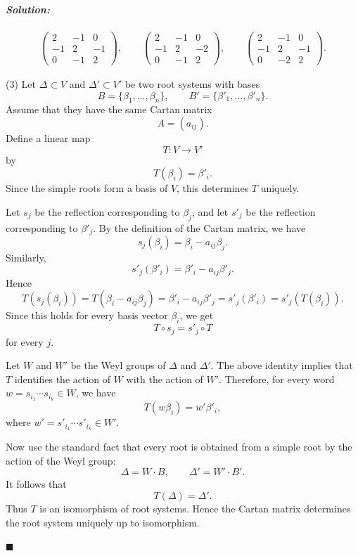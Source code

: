 \documentclass[12pt, a4paper]{article}
\newenvironment{solution}
  {\paragraph{\textit{Solution:}}\par\medskip}
  {\hfill$\blacksquare$\vspace{0.1cm}}
\begin{document}
\begin{solution}
\begin{align*}
  \begin{pmatrix}
2&-1&0\\
-1&2&-1\\
0&-1&2
\end{pmatrix}, \qquad 
\begin{pmatrix}
2&-1&0\\
-1&2&-2\\
0&-1&2
\end{pmatrix}, \qquad 
\begin{pmatrix}
2&-1&0\\
-1&2&-1\\
0&-2&2
\end{pmatrix}.
\end{align*}

(3) Let \(\Delta\subset V\) and \(\Delta'\subset V'\) be two root systems with bases
\[
B=\{\beta_1,\dots,\beta_n\},
\qquad
B'=\{\beta'_1,\dots,\beta'_n\}.
\]
Assume that they have the same Cartan matrix
\[
A=(a_{ij}).
\]
Define a linear map
\[
T:V\longrightarrow V'
\]
by
\[
T(\beta_i)=\beta'_i.
\]
Since the simple roots form a basis of \(V\), this determines \(T\) uniquely.

Let \(s_j\) be the reflection corresponding to \(\beta_j\), and let \(s'_j\) be the
reflection corresponding to \(\beta'_j\). By the definition of the Cartan matrix,
we have
\[
s_j(\beta_i)=\beta_i-a_{ij}\beta_j.
\]
Similarly,
\[
s'_j(\beta'_i)=\beta'_i-a_{ij}\beta'_j.
\]
Hence
\[
T(s_j(\beta_i))
=
T(\beta_i-a_{ij}\beta_j)
=
\beta'_i-a_{ij}\beta'_j
=
s'_j(\beta'_i)
=
s'_j(T(\beta_i)).
\]
Since this holds for every basis vector \(\beta_i\), we get
\[
T\circ s_j=s'_j\circ T
\]
for every \(j\).

Let \(W\) and \(W'\) be the Weyl groups of \(\Delta\) and \(\Delta'\). The above
identity implies that \(T\) identifies the action of \(W\) with the action of
\(W'\). Therefore, for every word \(w=s_{i_1}\cdots s_{i_k}\in W\), we have
\[
T(w\beta_i)=w'\beta'_i,
\]
where \(w'=s'_{i_1}\cdots s'_{i_k}\in W'\).

Now use the standard fact that every root is obtained from a simple root by the
action of the Weyl group:
\[
\Delta=W\cdot B,
\qquad
\Delta'=W'\cdot B'.
\]
It follows that
\[
T(\Delta)=\Delta'.
\]
Thus \(T\) is an isomorphism of root systems. Hence the Cartan matrix determines
the root system uniquely up to isomorphism.

\end{solution}
\end{document}
